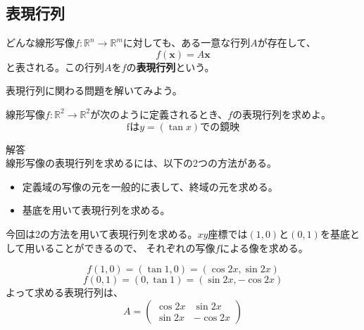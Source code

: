 \documentclass{jlreq}
\begin{document}
\subsection{表現行列}

\begin{theorembox}[表現行列]
  どんな線形写像$f: \mathbb{R}^n \to \mathbb{R}^m$に対しても、ある一意な行列$A$が存在して、
  \begin{equation*}
    f(\boldsymbol{x}) = A \boldsymbol{x}
  \end{equation*}
  と表される。この行列$A$を$f$の\textbf{表現行列}という。
\end{theorembox}

表現行列に関わる問題を解いてみよう。

\begin{problem}
  線形写像$f: \mathbb{R}^2 \to \mathbb{R}^2$が次のように定義されるとき、$f$の表現行列を求めよ。
  \begin{equation*}
    \text{fは}y = (\tan x) \text{での鏡映}
  \end{equation*}
  \dotfill

  解答 \\
  線形写像の表現行列を求めるには、以下の2つの方法がある。
  \begin{itemize}
    \item 定義域の写像の元を一般的に表して、終域の元を求める。
    \item 基底を用いて表現行列を求める。
  \end{itemize}

  今回は2の方法を用いて表現行列を求める。$xy$座標では$(1, 0)$と$(0, 1)$を基底として用いることができるので、
  それぞれの写像$f$による像を求める。

  \begin{equation*}
    f(1, 0) = (\tan 1, 0) = (\cos 2 x, \sin 2 x)
  \end{equation*}
  \begin{equation*}
    f(0, 1) = (0, \tan 1) = (\sin 2 x, -\cos 2 x)
  \end{equation*}
  よって求める表現行列は、
  \begin{equation*}
    A = \begin{pmatrix}
      \cos 2 x & \sin 2 x \\
      \sin 2 x & -\cos 2 x
    \end{pmatrix}
  \end{equation*}
\end{problem}
\end{document}
